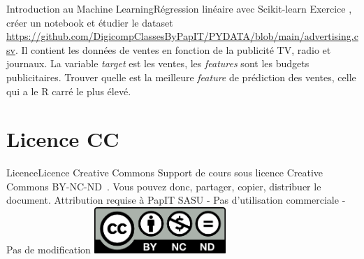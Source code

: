\documentclass{beamer}
\begin{document}
    \begin{frame}{Introduction au Machine Learning}{Régression linéaire avec Scikit-learn}
        Exercice \execcounterdispinc{}, créer un notebook et étudier le dataset \url{https://github.com/DigicompClassesByPapIT/PYDATA/blob/main/advertising.csv}.
        Il contient les données de ventes en fonction de la publicité TV, radio et journaux.
        \bigbreak
        La variable \textit{target} est les ventes, les \textit{features} sont les budgets publicitaires.
        Trouver quelle est la meilleure \textit{feature} de prédiction des ventes, celle qui a le R carré le plus élevé.
    \end{frame}


    \section{Licence CC}\label{sec:licence}

    \begin{frame}{Licence}{Licence Creative Commons}
        Support de cours sous licence Creative Commons BY-NC-ND~.
        \bigbreak
        Vous pouvez donc, partager, copier, distribuer le document.
        \bigbreak
        Attribution requise à PapIT SASU - Pas d’utilisation commerciale - Pas de modification
        \bigbreak
        \centering
        \includegraphics[width=5cm]{image/by-nc-nd-logo}
    \end{frame}
\end{document}
